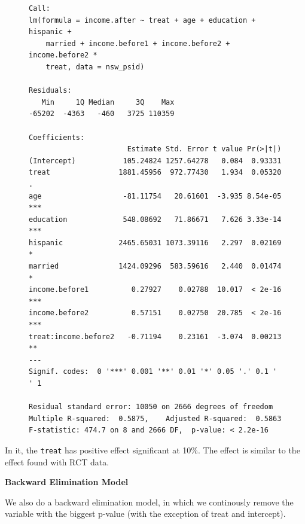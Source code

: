 \documentclass{article}
\begin{document}
\begin{figure}[H]
\centering
\begin{lstlisting}[style=Rstyle, caption=Possibly Best Model]
Call:
lm(formula = income.after ~ treat + age + education + hispanic + 
    married + income.before1 + income.before2 + income.before2 * 
    treat, data = nsw_psid)

Residuals:
   Min     1Q Median     3Q    Max 
-65202  -4363   -460   3725 110359 

Coefficients:
                       Estimate Std. Error t value Pr(>|t|)    
(Intercept)           105.24824 1257.64278   0.084  0.93331    
treat                1881.45956  972.77430   1.934  0.05320 .  
age                   -81.11754   20.61601  -3.935 8.54e-05 ***
education             548.08692   71.86671   7.626 3.33e-14 ***
hispanic             2465.65031 1073.39116   2.297  0.02169 *  
married              1424.09296  583.59616   2.440  0.01474 *  
income.before1          0.27927    0.02788  10.017  < 2e-16 ***
income.before2          0.57151    0.02750  20.785  < 2e-16 ***
treat:income.before2   -0.71194    0.23161  -3.074  0.00213 ** 
---
Signif. codes:  0 '***' 0.001 '**' 0.01 '*' 0.05 '.' 0.1 ' ' 1

Residual standard error: 10050 on 2666 degrees of freedom
Multiple R-squared:  0.5875,	Adjusted R-squared:  0.5863 
F-statistic: 474.7 on 8 and 2666 DF,  p-value: < 2.2e-16
\end{lstlisting}
\end{figure}

In it, the \texttt{treat} has positive effect significant at 10\%.
The effect is similar to the effect found with RCT data.

\textbf{Backward Elimination Model}

We also do a backward elimination model, in which we continously remove the variable with the biggest p-value (with the exception of treat and intercept).
\end{document}
